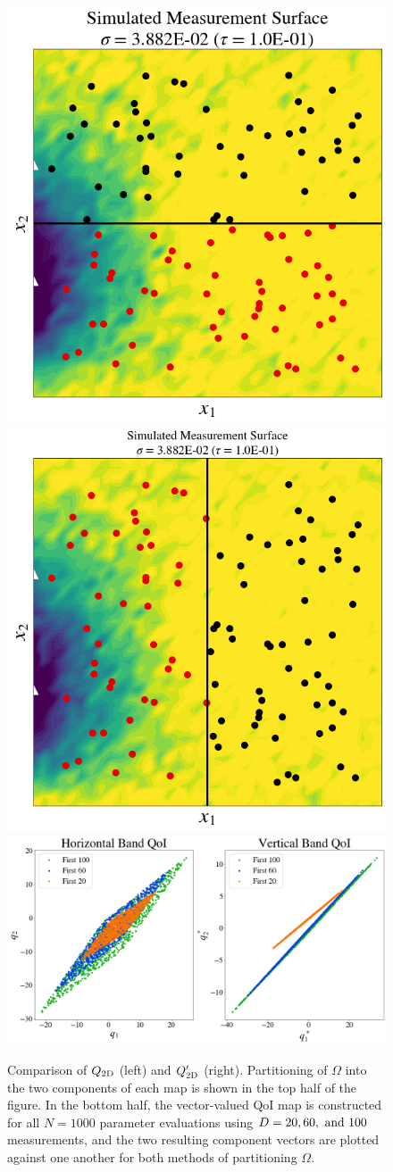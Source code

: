 \begin{figure}
\centering
  \includegraphics[width=0.475\linewidth]{figures/pde-highd/pde-highd_sensors_D2.png}
  \includegraphics[width=0.475\linewidth]{figures/pde-highd/pde-highd_sensors-alt_D2.png}
  \includegraphics[width=0.95\linewidth]{figures/pde-highd/pde-highd_geom_D2.png}
\caption{
Comparison of $Q_\text{2D}$ (left) and $Q_\text{2D}^\prime$ (right).
Partitioning of $\Omega$ into the two components of each map is shown in the top half of the figure.
In the bottom half, the vector-valued QoI map is constructed for all $N=1000$ parameter evaluations using $D=20, 60, \text{ and } 100$ measurements, and the two resulting component vectors are plotted against one another for both methods of partitioning $\Omega$.
}
\label{fig:pde-highd-2d-geometry}
\end{figure}

